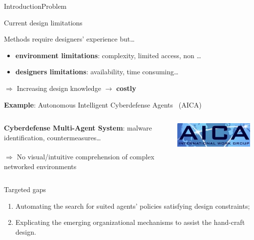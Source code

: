 \begin{frame}{Introduction}{Problem}


    \begin{alertblock}{Current design limitations}

        Methods require designers' experience but\dots

        \begin{itemize}
            \item \textbf{environment limitations}: complexity, limited access, non \dots
            \item \textbf{designers limitations}: availability, time consuming\dots
        \end{itemize}
        \vspace{1ex}
        $\Longrightarrow$ Increasing design knowledge $\rightarrow$ \textbf{costly}
    \end{alertblock}

    \begin{exampleblock}{\textbf{Example}: Autonomous Intelligent Cyberdefense Agents~\cite{Kott2023} (AICA)}

        \begin{columns}
            \hspace{5ex}
            \begin{column}{0.85\textwidth}
                \textbf{Cyberdefense Multi-Agent System}: malware identification, countermeasures\dots \\ \phantom{x} \\
                $\Longrightarrow$ No visual/intuitive comprehension of complex networked environments
            \end{column}
            \begin{column}{0.22\textwidth}
                \hspace{-2.5ex}
                \includegraphics[width=0.8\linewidth]{figures/AICA_IWG.jpg}
            \end{column}
        \end{columns}

    \end{exampleblock}

    \begin{alertblock}{Targeted gaps}
        \begin{enumerate}
            \item Automating the search for suited agents' policies satisfying design constraints;
            \item Explicating the emerging organizational mechanisms to assist the hand-craft design.
        \end{enumerate}
    \end{alertblock}

\end{frame}
